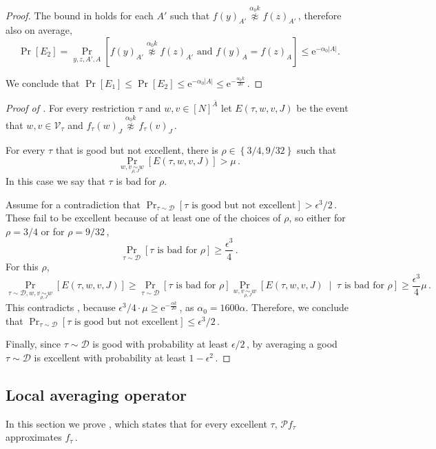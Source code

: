\documentclass[11pt]{article}
\numberwithin{equation}{section}
\theoremstyle{definition}
\theoremstyle{plain}
\newcommand{\eee}{\mathrm e}
\newcommand{\Prob}[2][]{\Pr_{{#1}}\left[#2\right]} %
\newcommand{\abs}[1]{\lvert#1\rvert} %
\newcommand{\given}{\;\middle\vert\;} %
\newcommand{\Set}[1]{\left\{#1\right\}} %
\newcommand\f{f} %
\newcommand\bh{\mathcal{P}\f_\tau} %
\newcommand\neqg[1]{\stackrel{{#1}}{ \not\approx}} %
\newcommand\cons{\mathcal{V}} %
\newcommand\cor[1]{\underset{\scriptscriptstyle#1}{\sim}} %
\begin{document}
\begin{proof}
	The bound in  holds for each $A'$ such that $\f(y)_{A'}\neqg{\alpha_0 k}\f(z)_{A'}$\,, therefore also on average,
	\[ \Prob{E_2}=\Prob[y,z,A',A]{\f(y)_{A'}\neqg{\alpha_0 k}\f(z)_{A'} \textrm{ and } \f(y)_{A}=\f(z)_{A}} \leq  \eee^{-\alpha_0 \abs{A}}. \]
	
	We conclude that $\Pr[E_1]\leq \Pr[E_2]\leq \eee^{-\alpha_0 \abs{A}}\leq \eee^{-\frac{\alpha_0 k}{20}}$\,.
%
%
%
%
%
\end{proof}

\begin{proof}[Proof of ]
	For every restriction $\tau$ and $w,v\in[N]^{\bar{A}}$ let $E(\tau,w,v,J)$ be the event that $ w,v\in\cons_\tau$ and $ f_\tau(w)_J \neqg{\alpha_0 k} f_\tau(v)_J$\,. %
	
	For every $\tau$ that is good but not excellent, there is 
	$\rho\in \Set{3/4,9/32} $ %
	such that
	\[ \Prob[w,v\cor{\rho,J}{w}]{E(\tau,w,v,J)} > \mu\,. \] %
	In this case we say that $\tau$ is bad for $\rho$.
	
Assume %
for a  %
contradiction that $\Prob[\tau\sim\mathcal{D}]{\tau \text{ is good but not excellent}}>
%
\epsilon^3/2$\,. %
These fail to be excellent because of at least one of the choices of $\rho$, so either for 
%
$\rho = 3/4 $ or for $\rho = 9/32 $\,,%
	\[ \Prob[\tau\sim\mathcal{D}]{\tau \text{ is bad for }\rho} \geq \frac{\epsilon^3}{4}\,. \] %
	For this $\rho$,
	\[ \Prob[\tau\sim\mathcal{D},w,v\cor{\rho,J}{w}]{E(\tau,w,v,J)} \geq \Prob[\tau\sim\mathcal{D}]{\tau \text{ is bad for }\rho}\Prob[w,v\cor{\rho,J}{w}]{E(\tau,w,v,J) \given \tau \text{ is bad for }\rho} \geq \frac{\epsilon^3}{4}\mu\,.  \] %
	This contradicts , because 
%
$\epsilon^3/4\cdot\mu  \geq \eee^{-\frac{\alpha k}{20}} $\,, %
%
as $\alpha_0 = 1600\alpha$.  Therefore, we conclude that $\Prob[\tau\sim\mathcal{D}]{\tau \text{ is good but not excellent}}\leq
%
	\epsilon^3/2$\,.%
	
	Finally, since $\tau\sim\mathcal{D}$ is good with probability at least 
${\epsilon}/{2}$\,, %
by  averaging a good $\tau\sim\mathcal{D}$ is excellent with probability at least $1-\epsilon^2$\,.
\end{proof}


\subsection{Local averaging operator} \label{sec:local average}
In this section we prove , which states that for every excellent $\tau$, $\bh$ approximates $\f_\tau$\,. 
\end{document}
